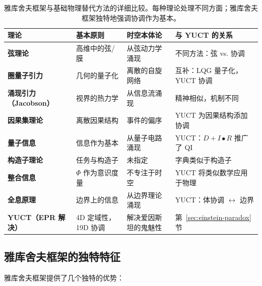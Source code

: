\documentclass[11pt,a4paper]{article}
\begin{document}
	\begin{table}[htbp]
		\centering
		\scriptsize
		\begin{tabular}{p{}p{}p{}p{}}
			\toprule
			\textbf{理论} & \textbf{基本原则} & \textbf{时空本体论} & \textbf{与 YUCT 的关系} \\
			\midrule
			\textbf{弦理论} & 
			高维中的弦/膜 & 
			从弦动力学涌现 & 
			不同方法：弦 vs. 协调 \\
			\hline
			\textbf{圈量子引力} & 
			几何的量子化 & 
			离散的自旋网络 & 
			互补：LQG 量子化，YUCT 协调 \\
			\hline
			\textbf{涌现引力（Jacobson）} & 
			视界的热力学 & 
			从信息流涌现 & 
			精神相似，机制不同 \\
			\hline
			\textbf{因果集理论} & 
			离散因果结构 & 
			事件的偏序 & 
			YUCT 为因果结构添加协调 \\
			\hline
			\textbf{量子信息} & 
			信息作为基本 & 
			从量子电路涌现 & 
			YUCT：$D+I•R$ 推广了 QI \\
			\hline
			\textbf{构造子理论} & 
			任务与构造子 & 
			未指定 & 
			字典类似于构造子 \\
			\hline
			\textbf{整合信息} & 
			$\Phi$ 作为意识度量 & 
			不专注于时空 & 
			YUCT 将类似数学应用于物理 \\
			\hline
			\textbf{全息原理} & 
			边界上的信息 & 
			从边界理论涌现 & 
			YUCT：体协调 $\leftrightarrow$ 边界 \\
			\hline
			\textbf{YUCT（EPR 解决）} & 
			4D 定域性，19D 协调 & 
			解决爱因斯坦的鬼魅性 & 
			第~\ref{sec:einstein-paradox}节 \\
			\bottomrule
		\end{tabular}
		\caption{雅库舍夫框架与基础物理替代方法的详细比较。每种理论处理不同方面；雅库舍夫框架独特地强调协调作为基本。}
	\end{table}
	
	\subsection{雅库舍夫框架的独特特征}
	
	雅库舍夫框架提供了几个独特的优势：
	
\end{document}
